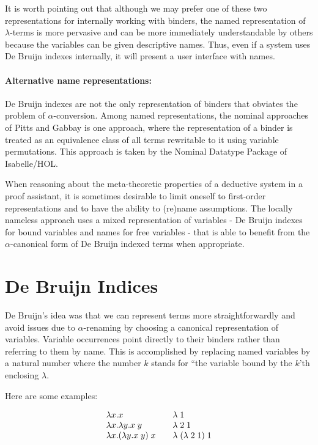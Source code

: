 It is worth pointing out that although we may prefer one of these two
representations for internally working with binders, the named
representation of $\lambda$-terms is more pervasive and can be more
immediately understandable by others because the variables can be
given descriptive names. Thus, even if a system uses De Bruijn indexes
internally, it will present a user interface with names.


\paragraph{Alternative name representations:}
De Bruijn indexes are not the only representation of binders that
obviates the problem of $\alpha$-conversion. Among named
representations, the nominal approaches of Pitts and Gabbay
\cite{Gabbay:LICS99} is one approach, where the representation of a
binder is treated as an equivalence class of all terms rewritable to
it using variable permutations. This approach is taken by the Nominal
Datatype Package of Isabelle/HOL.

When reasoning about the meta-theoretic properties of a deductive
system in a proof assistant, it is sometimes desirable to limit
oneself to first-order representations and to have the ability to
(re)name assumptions. The locally nameless approach
\cite{Aydemir:POPL08} uses a mixed representation of variables - De Bruijn indexes for bound variables and
names for free variables - that is able to benefit from the
$\alpha$-canonical form of De Bruijn indexed terms when appropriate.


\section{De Bruijn Indices}\label{sec:debruijn}

De Bruijn's idea was that we can represent terms more
straightforwardly and avoid issues due to $\alpha$-renaming by
choosing a canonical representation of variables. Variable occurrences
point directly to their binders rather than referring to them by
name. This is accomplished by replacing named variables by a natural
number where the number $k$ stands for ``the variable bound by the
$k$'th enclosing $\lambda$.

Here are some examples:

\[
\begin{array}{l@{\qquad}l}
\lam x. x  & \lamdb 1 \\
\lam x. \lam y . x\;y & \lamdb 2\; 1\\
\lam x. (\lam y. x \; y)\; x & \lamdb (\lamdb 2\;1) \;1
\end{array}
\]

